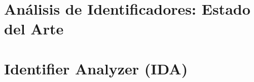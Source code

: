 \documentclass[a4paper,12pt]{report}
\begin{document}
%


%

%

\setcounter{chapter}{2}
\chapter{Análisis de Identificadores: Estado del Arte}


\chapter{Identifier Analyzer (IDA)}


%



\end{document}
